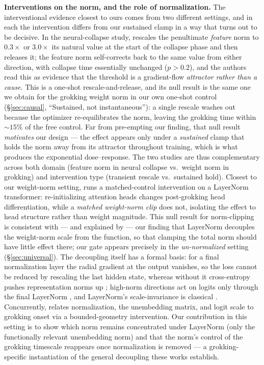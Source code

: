 \documentclass[10pt,twocolumn]{article}
\begin{document}
\textbf{Interventions on the norm, and the role of normalization.}
The interventional evidence closest to ours comes from two different settings, and in each the intervention
differs from our sustained clamp in a way that turns out to be decisive. In the neural-collapse study,
\citet{neuralcollapse2026} rescales the penultimate \emph{feature} norm to $0.3\times$ or $3.0\times$ its
natural value at the start of the collapse phase and then releases it; the feature norm self-corrects back to
the same value from either direction, with collapse time essentially unchanged ($p>0.2$), and the authors
read this as evidence that the threshold is a gradient-flow \emph{attractor rather than a cause}. This is a
one-shot rescale-and-release, and its null result is the same one we obtain for the grokking weight norm in
our own one-shot control (\S\ref{sec:causal}, ``Sustained, not instantaneous''): a single rescale washes out
because the optimizer re-equilibrates the norm, leaving the grokking time within $\sim\!15\%$ of the free
control. Far from pre-empting our finding, that null result \emph{motivates} our design --- the effect
appears only under a \emph{sustained} clamp that holds the norm away from its attractor throughout training,
which is what produces the exponential dose--response. The two studies are thus complementary across both
domain (feature norm in neural collapse vs.\ weight norm in grokking) and intervention type (transient
rescale vs.\ sustained hold). Closest to our weight-norm setting, \citet{verma2026regimes} runs a
matched-control intervention on a LayerNorm
transformer: re-initializing attention heads changes post-grokking head differentiation, while a
\emph{matched weight-norm clip} does not, isolating the effect to head structure rather than weight
magnitude. This null result for norm-clipping is consistent with --- and explained by --- our finding
that LayerNorm decouples the weight-norm scale from the function, so that clamping the total norm should have
little effect there; our gate appears precisely in the \emph{un-normalized} setting (\S\ref{sec:universal}).
The decoupling itself has a formal basis: for a final normalization layer the radial gradient at the output
vanishes, so the loss cannot be reduced by rescaling the last hidden state, whereas without it cross-entropy
pushes representation norms up \citep{gatednorm2026}; high-norm directions act on logits only through the
final LayerNorm \citep{gurnee2024confidence}, and LayerNorm's scale-invariance is classical
\citep{zhang2019rmsnorm}. Concurrently, \citet{yildirim2026geometric} relates normalization, the unembedding
matrix, and logit scale to grokking onset via a bounded-geometry intervention. Our contribution in this
setting is to show which norm remains concentrated under LayerNorm (only the functionally relevant
unembedding norm) and that the norm's control of the grokking timescale reappears once normalization is removed --- a grokking-specific
instantiation of the general decoupling these works establish.
\end{document}

